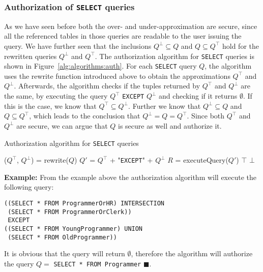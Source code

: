 \subsubsection{Authorization of \texttt{SELECT} queries}

As we have seen before both the over- and under-approximation are secure, since all the referenced tables in those queries are readable to the user issuing the query.
%
We have further seen that the inclusions $Q^\bot \subseteq Q$ and $Q \subseteq Q^\top$ hold for the rewritten queries $Q^\bot$ and $Q^\top$.
%
The authorization algorithm for \texttt{SELECT} queries is shown in Figure~\ref{alg:algorithms:auth}.
%
For each \texttt{SELECT} query $Q$, the algorithm uses the rewrite function introduced above to obtain the approximations $Q^\top$ and $Q^\bot$.
%
Afterwards, the algorithm checks if the tuples returned by $Q^\top$ and $Q^\bot$ are the same, by executing the query  $Q^\top$ \texttt{EXCEPT} $Q^\bot$ and checking if it returns $\emptyset$. 
%
If this is the case, we know that $Q^\top \subseteq Q^\bot$.
%
Further we know that $Q^\bot \subseteq Q$ and $Q \subseteq Q^\top$, which leads to the conclusion that $Q^\bot = Q = Q^\top$.
%
Since both $Q^\top$ and $Q^\bot$ are secure, we can argue that $Q$ is secure as well and authorize it.
%
\begin{algorithm}
\caption{Authorization algorithm for \texttt{SELECT} queries}
\label{alg:algorithms:auth}
	\SetAlgoLined
	($Q^\top$, $Q^\bot$) = rewrite($Q$)\;
	$Q'$ = $Q^\top$ + "\texttt{EXCEPT}" + $Q^\bot$\;
	$R$ = executeQuery($Q'$)\;
		{\Return $\top$ \;}
		{\Return $\bot$ \;}
\end{algorithm}

\smallskip
\noindent
{\bf Example:}
From the example above the authorization algorithm will execute the following query:
\begin{verbatim}
((SELECT * FROM ProgrammerOrHR) INTERSECTION
 (SELECT * FROM ProgrammerOrClerk))
 EXCEPT
((SELECT * FROM YoungProgrammer) UNION
 (SELECT * FROM OldProgrammer))
\end{verbatim}
\noindent
It is obvious that the query will return $\emptyset$, therefore the algorithm will authorize the query $Q = $ \texttt{SELECT * FROM Programmer} $\blacksquare$.

